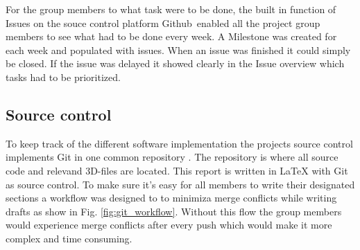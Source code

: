 For the group members to what task were to be done, the built in function of Issues on the souce control platform Github\textregistered \ enabled all the project group members to see what had to be done every week. A Milestone was created for each week and populated with issues. When an issue was finished it could simply be closed. If the issue was delayed it showed clearly in the Issue overview which tasks had to be prioritized. 

\subsection{Source control}
To keep track of the different software implementation the projects source control implements Git in one common repository \cite{repo}. The repository is where all source code and relevand 3D-files are located. This report is written in LaTeX with Git as source control. To make sure it's easy for all members to write their designated sections a workflow was designed to to minimiza merge conflicts while writing drafts as show in Fig. \ref{fig:git_workflow}. Without this flow the group members would experience merge conflicts after every push which would make it more complex and time consuming.











